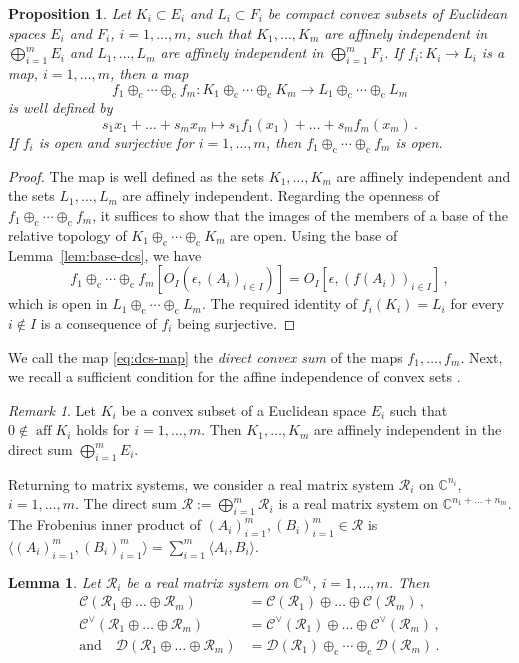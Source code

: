 \documentclass[a4paper,11pt,reqno]{amsart}
\newcommand{\C}{\mathbb{C}}
\newcommand{\cC}{\mathcal{C}}
\newcommand{\cD}{\mathcal{D}}
\newcommand{\cR}{\mathcal{R}}
\newcommand{\dcs}{\oplus_\mathrm{c}}
\DeclareMathOperator\aff{aff}
\newtheorem{lem}[thm]{Lemma}
\newtheorem{prop}[thm]{Proposition}
\theoremstyle{definition}
\theoremstyle{remark}
\newtheorem{rem}[thm]{Remark}
\numberwithin{equation}{section}
\begin{document}
\begin{prop}\label{pro:dcs-map}
Let $K_i\subset E_i$ and $L_i\subset F_i$ be compact convex subsets of Euclidean 
spaces $E_i$ and $F_i$, $i=1,\dots,m$, such that $K_1,\dots,K_m$ are affinely 
independent in $\bigoplus_{i=1}^mE_i$ and $L_1,\dots,L_m$ are affinely 
independent in $\bigoplus_{i=1}^mF_i$. If $f_i:K_i\to L_i$ is a map, 
$i=1,\dots,m$, then a map 
\begin{equation}\label{eq:dcs-map}\textstyle
f_1\dcs\cdots\dcs f_m:K_1\dcs\cdots\dcs K_m \to L_1\dcs\cdots\dcs L_m
\end{equation}
is well defined by
\[\textstyle
s_1x_1+\dots+s_mx_m \mapsto s_1f_1(x_1)+\dots+s_mf_m(x_m)\,.
\]
If $f_i$ is open and surjective for $i=1,\dots,m$, then $f_1\dcs\cdots\dcs f_m$ 
is open.
\end{prop}
%
\begin{proof}
The map is well defined as the sets $K_1,\dots,K_m$ are affinely independent
and the sets $L_1,\dots,L_m$ are affinely independent. Regarding the openness
of $f_1\dcs\cdots\dcs f_m$, it suffices to show that the images of the members 
of a base of the relative topology of $K_1\dcs\cdots\dcs K_m$ are open. 
Using the base of Lemma~\ref{lem:base-dcs}, we have
\[
f_1\dcs\cdots\dcs f_m[O_I(\epsilon,(A_i)_{i\in I})]
=O_I[\epsilon,(f(A_i))_{i\in I}]\,,
\]
which is open in $L_1\dcs\cdots\dcs L_m$. The required identity of $f_i(K_i)=L_i$ 
for every $i\not\in I$ is a consequence of $f_i$ being surjective.
\end{proof}
%
We call the map \eqref{eq:dcs-map} the \emph{direct convex sum} of the maps 
$f_1,\dots,f_m$. Next, we recall a sufficient condition for the affine 
independence of convex sets \cite{ClausingPapadopoulou1978}.
\par
%
\begin{rem}\label{rem:embedded-aff-ind}
Let $K_i$ be a convex subset of a Euclidean space $E_i$ such that 
$0\not\in\aff K_i$ holds for $i=1,\dots,m$. Then $K_1,\dots,K_m$ 
are affinely independent in the direct sum $\bigoplus_{i=1}^m E_i$.
\end{rem}
%
Returning to matrix systems, we consider a real matrix system $\cR_i$ 
on $\C^{n_i}$, $i=1,\dots,m$. The direct sum $\cR:=\bigoplus_{i=1}^m\cR_i$ is 
a real matrix system on $\C^{n_1+\dots+n_m}$. The Frobenius inner product of 
$(A_i)_{i=1}^m,(B_i)_{i=1}^m\in\cR$ is 
$\langle (A_i)_{i=1}^m,(B_i)_{i=1}^m\rangle=\sum_{i=1}^m\langle A_i,B_i\rangle$.
\par
%
\begin{lem}\label{lem:dir-sum}
Let $\cR_i$ be a real matrix system on $\C^{n_i}$, $i=1,\ldots,m$. Then 
\begin{align*}
\cC(\cR_1\oplus\dots\oplus\cR_m) &=\cC(\cR_1)\oplus\dots\oplus\cC(\cR_m)\,,\\
\cC^\vee(\cR_1\oplus\dots\oplus\cR_m) 
 &=\cC^\vee(\cR_1)\oplus\dots\oplus\cC^\vee(\cR_m)\,,\\
\text{and}\quad
\cD(\cR_1\oplus\dots\oplus\cR_m) &=\cD(\cR_1)\dcs\cdots\dcs\cD(\cR_m)\,.
\end{align*}
\end{lem}
\end{document}
